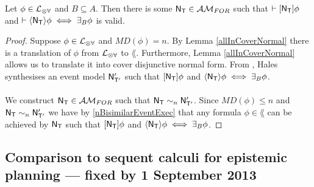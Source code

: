 \begin{corr} \label{approximatingBRestricted}
Let $\phi \in \langArbAct$ and $B \subseteq A$.
Then there is some $\evM_\evT \in \forestClass$ such that $\vdash \sqex{\evM_\evT} \phi$ and
$\vdash \anex{\evM_\evT} \phi \iff \exists_B \phi$ is valid.
\end{corr}

\begin{proof}
Suppose $\phi \in \langArbAct$ and $MD(\phi) = n$.
By Lemma \ref{allInCoverNormal} there is a translation of $\phi$ from $\langArbAct$ to $\lang$.
Furthermore, Lemma \ref{allInCoverNormal} allows us to translate it into cover disjunctive normal form.
From \cite{hales13synthesis}, Hales synthesises an event model $\evM'_{\evT'}$ such that $\sqex{\evM_\evT} \phi$ and $\anex{\evM_\evT}
\phi \iff \exists_B \phi$.\\
\\
We construct $\evM_\evT \in \forestClass$ such that $\evM_\evT \sim_n \evM'_{\evT'}$.
Since $MD(\phi) \leq n$ and $\evM_\evT \sim_n \evM'_{\evT'}$ we have by \ref{nBisimilarEventExec} that any
formula $\phi \in \lang$ can be achieved by $\evM_\evT$ such that $\sqex{\evM_\evT} \phi$ and $\anex{\evM_\evT} \phi
\iff \exists_B \phi$.
\end{proof}

\subsection{Comparison to sequent calculi for epistemic planning --- fixed by 1 September 2013}

